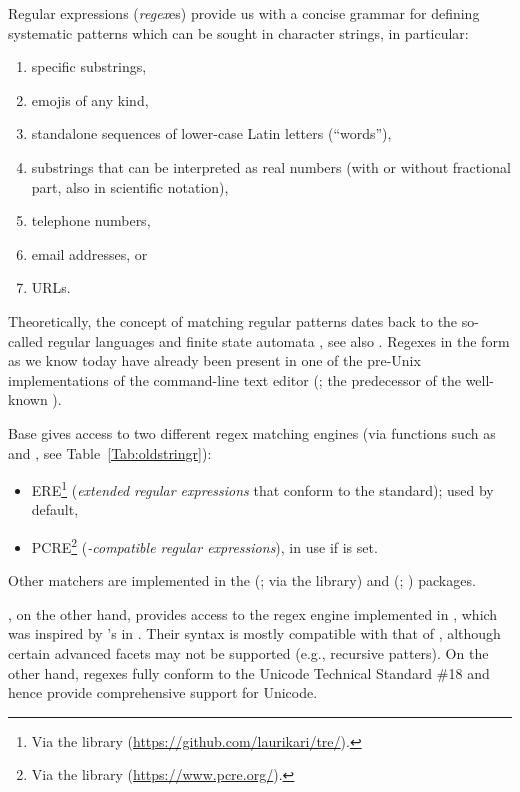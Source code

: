 \documentclass[nojss]{jss}
\begin{document}
Regular expressions (\textit{regex}es) provide us with a concise
grammar for defining systematic patterns which can be sought in character
strings, in particular:
\begin{enumerate}
  \item specific substrings,
  \item emojis of any kind,
  \item standalone sequences of lower-case Latin letters (``words''),
  \item substrings that can be interpreted as real numbers
  (with or without fractional part, also in scientific notation),
  \item telephone numbers,
  \item email addresses, or
  \item URLs.
\end{enumerate}
Theoretically, the concept of matching regular patterns
dates back to the so-called regular languages and finite state
automata \citep{kleene},
see also \citep{hopcroftullman,automata}.
Regexes in the form as we know today have already been present
in one of the pre-Unix implementations of the command-line text
editor  (\citealp{qed}; the predecessor of the well-known ).

Base   gives access to two different regex matching engines
(via functions such as  and ,
see Table~\ref{Tab:oldstringr}):
\begin{itemize}
\item {ERE}\footnote{Via the  library
(\url{https://github.com/laurikari/tre/}).}
(\textit{extended regular expressions} that conform
to the  standard);
used by default,
\item {PCRE}\footnote{Via the 
library (\url{https://www.pcre.org/}).}
(\textit{-compatible regular expressions}),
in use if  is set.
\end{itemize}
Other matchers are implemented in the 
(\citealp{ore}; via the  library)
and  (\citealp{re2r}; ) packages.


, on the other hand, provides access to the regex engine
implemented in , which was inspired
by 's 
in . Their syntax is mostly compatible with that of ,
although certain advanced facets may not be supported (e.g., recursive
patters). On the other hand,  regexes fully conform to the
Unicode Technical Standard \#18 \citep{uts18:regex} and hence provide
comprehensive support for Unicode.
\end{document}
